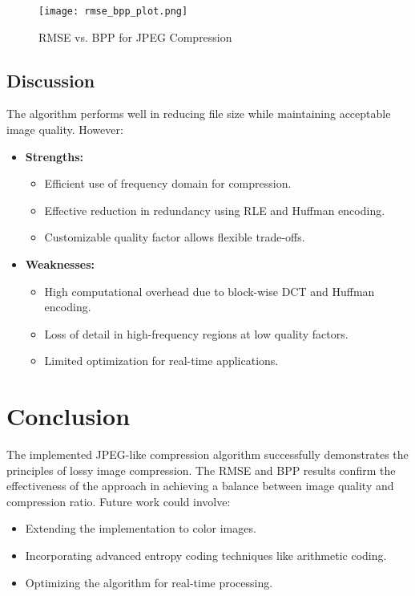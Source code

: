 \documentclass[12pt,a4paper]{article}
\begin{document}
\begin{figure}[h!]
\centering
\texttt{[image: rmse\_bpp\_plot.png]}
\caption{RMSE vs. BPP for JPEG Compression}
\label{fig:rmse_bpp}
\end{figure}

\subsection{Discussion}
The algorithm performs well in reducing file size while maintaining acceptable image quality. However:
\begin{itemize}
    \item \textbf{Strengths:} 
    \begin{itemize}
        \item Efficient use of frequency domain for compression.
        \item Effective reduction in redundancy using RLE and Huffman encoding.
        \item Customizable quality factor allows flexible trade-offs.
    \end{itemize}
    \item \textbf{Weaknesses:}
    \begin{itemize}
        \item High computational overhead due to block-wise DCT and Huffman encoding.
        \item Loss of detail in high-frequency regions at low quality factors.
        \item Limited optimization for real-time applications.
    \end{itemize}
\end{itemize}

\section{Conclusion}
The implemented JPEG-like compression algorithm successfully demonstrates the principles of lossy image compression. The RMSE and BPP results confirm the effectiveness of the approach in achieving a balance between image quality and compression ratio. Future work could involve:
\begin{itemize}
    \item Extending the implementation to color images.
    \item Incorporating advanced entropy coding techniques like arithmetic coding.
    \item Optimizing the algorithm for real-time processing.
\end{itemize}
\end{document}
